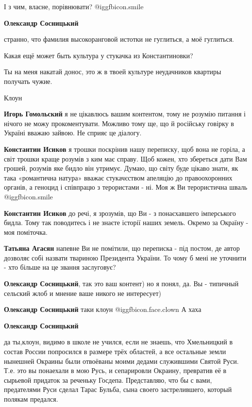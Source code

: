 \begin{itemize}
\begin{itemize}
І з чим, власне, порівнювати?  @igg{fbicon.smile} 


\textbf{Олександр Сосницький} 

странно, что фамилия высокоранговой истотки не гуглиться, а моё гуглиться.

Какая ещё может быть культура у стукачка из Константиновки?

Ты на меня накатай донос, это ж в твоей культуре неудачников квартиры получать
чужие.

Клоун

\textbf{Игорь Гомольский} я не цікавлюсь вашим контентом, тому не розумію питання і нічого не можу прокоментувати.
Можливо тому ще, що й російську говірку в Україні вважаю зайвою. Не сприяє це діалогу.

\textbf{Константин Исиков} я трошки поскрінив нашу переписку, щоб вона не горіла, а світ трошки краще розумів з ким має справу. Щоб кожен, хто збереться дати Вам грошей, розумів яке бидло він утримує.
Думаю, що світу буде цікаво знати, як така «романтична натура» вважає стукачєством апеляцію до правоохоронних органів, а геноцид і співпрацю з терористами - ні.
Моя ж Ви терористична шваль  @igg{fbicon.smile} 

\textbf{Константин Исиков} до речі, я зрозумів, що Ви - з понаєхавшего імперського бидла. Тому так поводитесь і не знаєте історії наших земель. Окремо за Окраїну - моя поміточка.

\textbf{Татьяна Агасян} напевне Ви не помітили, що переписка - під постом, де автор дозволяє собі назвати твариною Президента України. То чому б мені не уточнити - хто більше на це звання заслуговує?

\textbf{Олександр Сосницький}, так это ваш контент) но я понял, да. Вы - типичный сельский жлоб и мнение ваше никого не интересует)

\textbf{Олександр Сосницький} таки клоун  @igg{fbicon.face.clown} 
А хаха

\textbf{Олександр Сосницький} 

да ты,клоун, видимо в школе не учился, если не знаешь, что Хмельницкий в состав
России попросился в размере трёх областей, а все остальные земли нынешней
Окраины были отвоёваны моими дедами служившими Святой Руси. Т.е. это вы
понаехали в мою Русь, и сепарировли Окраину, превратив её в сырьевой придаток
за реченьку Госдепа. Представляю, что бы с вами, предателями Руси сделал Тарас
Бульба, сына своего застрелившего, который полякам предался.


\end{itemize}
\end{itemize}
